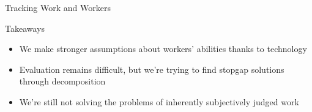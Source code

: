 \documentclass[presentation]{subfiles}
\begin{document}
\begin{frame}{Tracking Work and Workers} %
\end{frame}

\begin{frame}{Takeaways}
  \begin{itemize}
    \item We make stronger assumptions about workers' abilities thanks to technology
    \item Evaluation remains difficult, but we're trying to find stopgap solutions through decomposition
    \item We're still not solving the problems of inherently subjectively judged work
  \end{itemize}
\end{frame}

\end{document}
